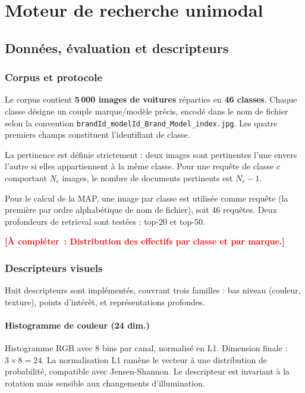 \documentclass[12pt,a4paper]{report}
\newcommand{\todo}[1]{\textcolor{red}{\textbf{[À compléter~: #1]}}}
\begin{document}
\part{Moteur de recherche unimodal}

\chapter{Données, évaluation et descripteurs}

\section{Corpus et protocole}

Le corpus contient \textbf{5\,000 images de voitures} réparties en \textbf{46 classes}. Chaque classe désigne un couple marque/modèle précis, encodé dans le nom de fichier selon la convention \texttt{brandId\_modelId\_Brand\_Model\_index.jpg}. Les quatre premiers champs constituent l'identifiant de classe.

La pertinence est définie strictement : deux images sont pertinentes l'une envers l'autre si elles appartiennent à la même classe. Pour une requête de classe $c$ comportant $N_c$ images, le nombre de documents pertinents est $N_c - 1$.

Pour le calcul de la MAP, une image par classe est utilisée comme requête (la première par ordre alphabétique de nom de fichier), soit 46 requêtes. Deux profondeurs de retrieval sont testées : top-20 et top-50.

\todo{Distribution des effectifs par classe et par marque.}

\section{Descripteurs visuels}

Huit descripteurs sont implémentés, couvrant trois familles : bas niveau (couleur, texture), points d'intérêt, et représentations profondes.

\subsection*{Histogramme de couleur (24 dim.)}

Histogramme RGB avec 8 bins par canal, normalisé en L1. Dimension finale : $3 \times 8 = 24$. La normalisation L1 ramène le vecteur à une distribution de probabilité, compatible avec Jensen-Shannon. Le descripteur est invariant à la rotation mais sensible aux changements d'illumination.
\end{document}
